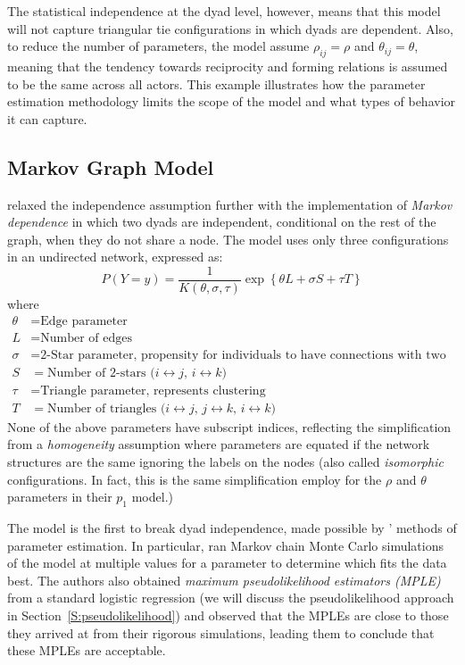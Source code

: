 The statistical independence at the dyad level, however, means that this model will 
not capture triangular tie configurations in which dyads are dependent.  Also, to 
reduce the number of parameters, the model assume $\rho_{ij} = \rho$ and $\theta_{ij} = \theta$, meaning that the 
tendency towards reciprocity and forming relations is assumed to be the same across all actors.  This example 
illustrates how the parameter estimation methodology limits the scope of the model and 
what types of behavior it can capture.  

\subsection{Markov Graph Model}
\citet{Frank:1986} relaxed the independence assumption further with the implementation 
of \textit{Markov dependence} in which two dyads are independent, conditional on the 
rest of the graph, when they do not share a node.  The model uses only three 
configurations in an undirected network, expressed as:
\[
	P( Y = y ) = \frac{1}{K( \theta, \sigma, \tau)}\exp 
				\left \{ \theta L + \sigma S + \tau T	\right \} 
	\]
where
\begin{align*}
	\theta &= 		\text{Edge parameter} \\
	L &= 		\text{Number of edges} \\
	\sigma &= \text{2-Star parameter, propensity for individuals to have connections 
with two actors} \\
	S &= \text{Number of 2-stars ($i \leftrightarrow j$, $i \leftrightarrow k$) }\\
	\tau	&= \text{Triangle parameter, represents clustering} \\
	T &= \text{Number of triangles ($i \leftrightarrow j$, $j \leftrightarrow k$, $i 
\leftrightarrow k$)}
\end{align*}
None of the above parameters have subscript indices, reflecting the simplification 
from a \textit{homogeneity} assumption where parameters are equated if the 
network structures are the same ignoring the labels on the nodes (also called \textit
{isomorphic} configurations.  In fact, this is the same simplification \citeauthor{Holland:1981} employ for the $\rho$ and $\theta$ parameters in their $p_1$ model.)  

The model is the first to break dyad independence, made possible by \citeauthor{Frank:1986}' methods of parameter estimation.  In particular, \citeauthor{Frank:1986} ran
Markov chain Monte Carlo simulations of the model at multiple values for a parameter 
to determine which fits the data best.  The authors also obtained \emph{maximum pseudolikelihood 
estimators (MPLE)} from a standard logistic regression (we will discuss the pseudolikelihood approach in Section~\ref{S:pseudolikelihood}) and observed that the 
MPLEs are close to those they arrived at from their rigorous simulations, leading them to conclude that these MPLEs are acceptable.  


